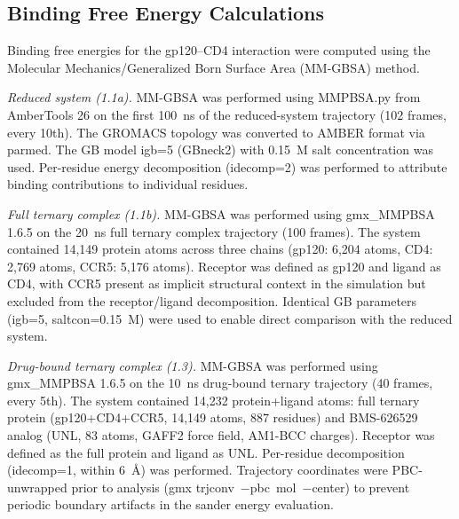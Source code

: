 \documentclass[11pt,a4paper]{article}
\begin{document}
\subsection{Binding Free Energy Calculations}

Binding free energies for the gp120--CD4 interaction were computed using the Molecular Mechanics/Generalized Born Surface Area (MM-GBSA) method.

\textit{Reduced system (1.1a).} MM-GBSA was performed using MMPBSA.py from AmberTools 26 on the first 100~ns of the reduced-system trajectory (102 frames, every 10th). The GROMACS topology was converted to AMBER format via parmed. The GB model igb=5 (GBneck2) with 0.15~M salt concentration was used. Per-residue energy decomposition (idecomp=2) was performed to attribute binding contributions to individual residues.

\textit{Full ternary complex (1.1b).} MM-GBSA was performed using gmx\_MMPBSA 1.6.5 on the 20~ns full ternary complex trajectory (100 frames). The system contained 14,149 protein atoms across three chains (gp120: 6,204 atoms, CD4: 2,769 atoms, CCR5: 5,176 atoms). Receptor was defined as gp120 and ligand as CD4, with CCR5 present as implicit structural context in the simulation but excluded from the receptor/ligand decomposition. Identical GB parameters (igb=5, saltcon=0.15~M) were used to enable direct comparison with the reduced system.

\textit{Drug-bound ternary complex (1.3).} MM-GBSA was performed using gmx\_MMPBSA 1.6.5 on the 10~ns drug-bound ternary trajectory (40 frames, every 5th). The system contained 14,232 protein+ligand atoms: full ternary protein (gp120+CD4+CCR5, 14,149 atoms, 887 residues) and BMS-626529 analog (UNL, 83 atoms, GAFF2 force field, AM1-BCC charges). Receptor was defined as the full protein and ligand as UNL. Per-residue decomposition (idecomp=1, within 6~\AA) was performed. Trajectory coordinates were PBC-unwrapped prior to analysis (gmx trjconv~$-$pbc~mol~$-$center) to prevent periodic boundary artifacts in the sander energy evaluation.
\end{document}
